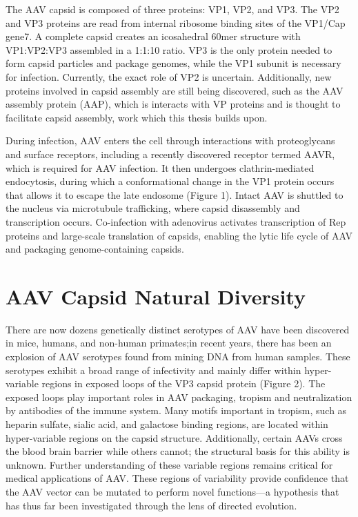 The AAV capsid is composed of three proteins: VP1, VP2, and VP3. The VP2 and VP3 proteins are read from internal ribosome binding sites of the VP1/Cap gene7. A complete capsid creates an icosahedral 60mer structure with VP1:VP2:VP3 assembled in a 1:1:10 ratio. VP3 is the only protein needed to form capsid particles and package genomes, while the VP1 subunit is necessary for infection. Currently, the exact role of VP2 is uncertain. Additionally, new proteins involved in capsid assembly are still being discovered, such as the AAV assembly protein (AAP)\cite{Naumer2012-xr}, which is interacts with VP proteins and is thought to facilitate capsid assembly, work which this thesis builds upon. 

During infection, AAV enters the cell through interactions with proteoglycans and surface receptors\cite{Uhrig2012-ze}, including a recently discovered receptor termed AAVR, which is required for AAV infection\cite{Pillay2016-kn}. It then undergoes clathrin-mediated endocytosis, during which a conformational change in the VP1 protein occurs that allows it to escape the late endosome (Figure 1)\cite{Tu2015-ts,Girod2002-ut}. Intact AAV is shuttled to the nucleus via microtubule trafficking, where capsid disassembly and transcription occurs\cite{Weitzman2011-qr}. Co-infection with adenovirus activates transcription of Rep proteins and large-scale translation of capsids, enabling the lytic life cycle of AAV and packaging genome-containing capsids\cite{Weitzman2011-qr}.
    

\section{AAV Capsid Natural Diversity}

There are now dozens genetically distinct serotypes of AAV have been discovered in mice, humans, and non-human primates\cite{Zinn2014-we};in recent years, there has been an explosion of AAV serotypes found from mining DNA from human samples\cite{Gao2004-vo}. These serotypes exhibit a broad range of infectivity and mainly differ within hyper-variable regions in exposed loops of the VP3 capsid protein (Figure 2). The exposed loops play important roles in AAV packaging, tropism and neutralization by antibodies of the immune system\cite{Wu2000-nx,Lochrie2006-wo}. Many motifs important in tropism, such as heparin sulfate, sialic acid, and galactose binding regions, are located within hyper-variable regions on the capsid structure\cite{Qing1999-ln,Summerford1999-ja,Kern2003-eu}. Additionally, certain AAVs cross the blood brain barrier while others cannot; the structural basis for this ability is unknown\cite{Zhang2011-yf}. Further understanding of these variable regions remains critical for medical applications of AAV. These regions of variability provide confidence that the AAV vector can be mutated to perform novel functions—a hypothesis that has thus far been investigated through the lens of directed evolution. 


